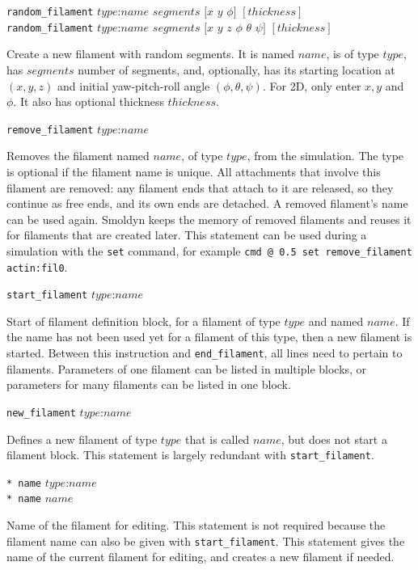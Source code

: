 \documentclass {scrbook}
\newcommand {\ttt} {\texttt}
\begin{document}
\begin{description}

\item{\ttt{random\_filament} $type$:$name$ $segments$ $[x$ $y$ $\phi]$ $[thickness]$}\\
\ttt{random\_filament} $type$:$name$ $segments$ $[x$ $y$ $z$ $\phi$ $\theta$ $\psi]$ $[thickness]$

Create a new filament with random segments. It is named $name$, is of type $type$, has $segments$ number of segments, and, optionally, has its starting location at $(x,y,z)$ and initial yaw-pitch-roll angle $(\phi, \theta, \psi)$. For 2D, only enter $x,y$ and $\phi$. It also has optional thickness $thickness$.

\item{\ttt{remove\_filament} $type$:$name$}

Removes the filament named $name$, of type $type$, from the simulation. The type is optional if the filament name is unique. All attachments that involve this filament are removed: any filament ends that attach to it are released, so they continue as free ends, and its own ends are detached. A removed filament's name can be used again. Smoldyn keeps the memory of removed filaments and reuses it for filaments that are created later. This statement can be used during a simulation with the \ttt{set} command, for example \ttt{cmd @ 0.5 set remove\_filament actin:fil0}.

\item{\ttt{start\_filament} $type$:$name$}

Start of filament definition block, for a filament of type $type$ and named $name$. If the name has not been used yet for a filament of this type, then a new filament is started. Between this instruction and \ttt{end\_filament}, all lines need to pertain to filaments. Parameters of one filament can be listed in multiple blocks, or parameters for many filaments can be listed in one block.

\item{\ttt{new\_filament} $type$:$name$}

Defines a new filament of type $type$ that is called $name$, but does not start a filament block. This statement is largely redundant with \ttt{start\_filament}.

\item{\ttt{* name} $type$:$name$} \\
\ttt{* name} $name$

Name of the filament for editing. This statement is not required because the filament name can also be given with \ttt{start\_filament}. This statement gives the name of the current filament for editing, and creates a new filament if needed.


\end{description}
\end{document}
